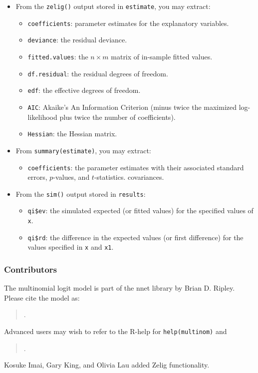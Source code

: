 \begin{itemize}
\item From the {\tt zelig()} output stored in {\tt estimate}, you may extract:
   \begin{itemize}
   \item {\tt coefficients}: parameter estimates for the explanatory
     variables.
   \item {\tt deviance}: the residual deviance.
   \item {\tt fitted.values}: the $n \times m$ matrix of in-sample
     fitted values.
   \item {\tt df.residual}: the residual degrees of freedom.
   \item {\tt edf}: the effective degrees of freedom.  
   \item {\tt AIC}: Akaike's An Information Criterion (minus twice the
     maximized log-likelihood plus twice the number of coefficients).
   \item {\tt Hessian}: the Hessian matrix.
   \end{itemize}

\item From {\tt summary(estimate)}, you may extract: 
   \begin{itemize}
   \item {\tt coefficients}: the parameter estimates with their
     associated standard errors, $p$-values, and $t$-statistics.
     covariances.  
   \end{itemize}

\item From the {\tt sim()} output stored in {\tt results}:
   \begin{itemize}
   \item {\tt qi\$ev}: the simulated expected (or fitted values) for
     the specified values of {\tt x}.  
   \item {\tt qi\$rd}: the difference in the expected values (or first
     difference) for the values specified in {\tt x} and
     {\tt x1}.
   \end{itemize}
\end{itemize}

\subsubsection{Contributors}

The multinomial logit model is part of the nnet library by Brian D.
Ripley.  Please cite the model as:
\begin{verse}
.
\end{verse}

Advanced users may wish to refer to the R-help for
\texttt{help(multinom)} and 
\begin{verse}
.
\end{verse}

Kosuke Imai, Gary King, and Olivia Lau added Zelig functionality.  















